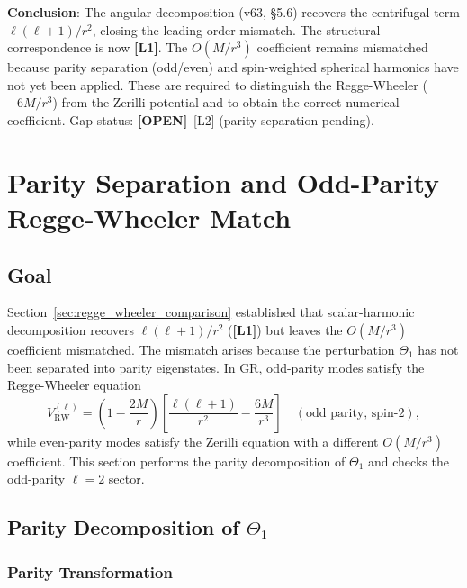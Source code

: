\documentclass[12pt]{article}
\theoremstyle{definition}
\theoremstyle{remark}
\newcommand{\Lone}{\textbf{[L1]}}
\newcommand{\OPEN}{\textbf{[OPEN]}}
\begin{document}
\textbf{Conclusion}: The angular decomposition (v63, §5.6) recovers the
centrifugal term $\ell(\ell+1)/r^2$, closing the leading-order mismatch.
The structural correspondence is now \Lone.  The $O(M/r^3)$ coefficient
remains mismatched because parity separation (odd/even) and spin-weighted
spherical harmonics have not yet been applied.  These are required to
distinguish the Regge-Wheeler ($-6M/r^3$) from the Zerilli potential
and to obtain the correct numerical coefficient.
Gap status: \OPEN\ [L2] (parity separation pending).

\section{Parity Separation and Odd-Parity Regge-Wheeler Match}
\label{sec:parity_separation}


\subsection{Goal}

Section~\ref{sec:regge_wheeler_comparison} established that scalar-harmonic
decomposition recovers $\ell(\ell+1)/r^2$ (\Lone) but leaves the $O(M/r^3)$
coefficient mismatched.  The mismatch arises because the perturbation $\Theta_1$
has not been separated into parity eigenstates.  In GR, odd-parity modes satisfy
the Regge-Wheeler equation
\begin{equation}
  V_{\text{RW}}^{(\ell)} = \left(1-\frac{2M}{r}\right)\!\left[
    \frac{\ell(\ell+1)}{r^2} - \frac{6M}{r^3}\right]
  \quad (\text{odd parity, spin-2}),
  \label{eq:VRW_odd}
\end{equation}
while even-parity modes satisfy the Zerilli equation with a different
$O(M/r^3)$ coefficient.  This section performs the parity decomposition
of $\Theta_1$ and checks the odd-parity $\ell=2$ sector.

\subsection{Parity Decomposition of $\Theta_1$}

\subsubsection{Parity Transformation}
\end{document}
